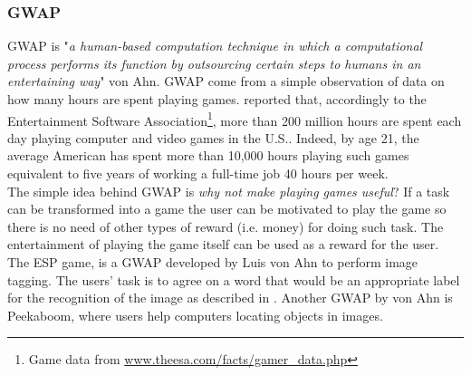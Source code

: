 \subsubsection{\acl{GWAP}}
\acf{GWAP} is "\emph{a human-based computation technique in which a computational
process performs its function by outsourcing certain steps to humans in an
entertaining way}" von Ahn.
\ac{GWAP} come from a simple observation of data on how many hours are spent
playing games. \cite{von2008designing} reported that, accordingly to the
Entertainment Software Association\footnote{Game data from
\url{www.theesa.com/facts/gamer_data.php}}, more than 200 million hours are spent
each day playing computer and video games in the U.S.. Indeed, by age 21, the
average American has spent more than 10,000 hours playing such games equivalent
to five years of working a full-time job 40 hours per week.\\

The simple idea behind \ac{GWAP} is \emph{why not make playing games useful}?
If a task can be transformed into a game the user can be motivated to play the
game so there is no need of other types of reward (i.e. money) for doing such
task. The entertainment of playing the game itself can be used as a reward for
the user.\\

The ESP game, is a \ac{GWAP} developed by Luis von Ahn to perform image tagging.
The users' task is to agree on a word that would be an appropriate label for the
recognition of the image as described in \cite{von2004labeling}. Another \ac{GWAP}
by von Ahn is Peekaboom, where users help computers locating objects in images.